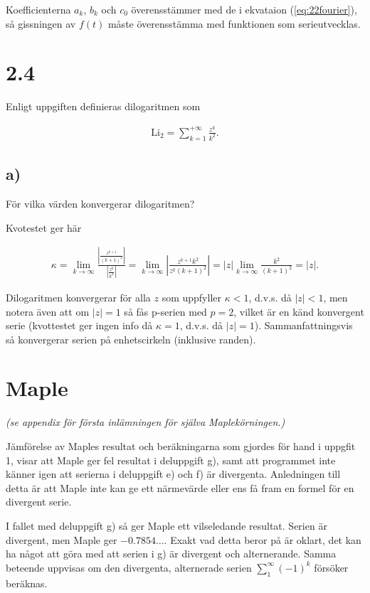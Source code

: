 \documentclass[a4paper]{article}
\begin{document}
Koefficienterna $a_k$, $b_k$ och $c_0$ överensstämmer med de i ekvataion
(\ref{eq:22fourier}), så gissningen av $f(t)$ måste överensstämma med funktionen
som serieutvecklas.

\section*{2.4}

Enligt uppgiften definieras dilogaritmen som

\begin{align*}
  \text{Li}_2 = \sum_{k=1}^{+\infty}\frac{z^k}{k^2}.
\end{align*}

\subsection*{a)}

För vilka värden konvergerar dilogaritmen?

Kvotestet ger här

\begin{align*}
  \kappa = \lim_{k\to\infty}\frac{\left|\frac{z^{k+1}}{(k+1)^2}\right|}{\left|\frac{z^k}{k^2}\right|} = \lim_{k\to\infty}\left| \frac{z^{k+1}k^2}{z^k(k+1)^2}\right| = |z|\lim_{k\to\infty}\frac{k^2}{(k+1)^2} = |z|.
\end{align*}

\noindent Dilogaritmen konvergerar för alla $z$ som uppfyller $\kappa < 1$, d.v.s. då $|z|
< 1$, men notera även att om $|z| = 1$ så fås p-serien med $p = 2$, vilket är en
känd konvergent serie (kvottestet ger ingen info då $\kappa = 1$, d.v.s. då $|z|
= 1$). Sammanfattningsvis så konvergerar serien på enhetscirkeln (inklusive randen).

\section*{Maple}

\emph{(se appendix för första inlämningen för själva Maplekörningen.)}

Jämförelse av Maples resultat och beräkningarna som gjordes för hand i uppgfit
1, visar att Maple ger fel resultat i deluppgift g), samt att programmet inte
känner igen att serierna i deluppgift e) och f) är divergenta. Anledningen till
detta är att Maple inte kan ge ett närmevärde eller ens få fram en formel för en
divergent serie.

I fallet med deluppgift g) så ger Maple ett vilseledande
resultat. Serien är divergent, men Maple ger $-0.7854\ldots$. Exakt vad detta
beror på är oklart, det kan ha något att göra med att serien i g) är divergent
och alternerande. Samma beteende uppvisas om den divergenta, alternerade serien
$\sum_1^{\infty}(-1)^k$ försöker beräknas.
\end{document}
